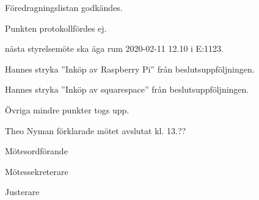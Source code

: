 \documentclass[10pt]{article}
\def\mo{Theo Nyman}
\def\ms{Hannes Björk}
\def\ji{???}
\begin{document}
\begin{paragrafer}

Föredragningslistan godkändes.


\begin{fyllnadsval} %



\end{fyllnadsval}

\begin{paragrafer}

Punkten protokollfördes ej.





 





\end{paragrafer}








\Mba nästa styrelsemöte ska äga rum 2020-02-11 12.10 i E:1123.


Hannes \ypa stryka ''Inköp av Raspberry Pi'' från beslutsuppföljningen.

\Mbaby 

Hannes \ypa stryka ''Inköp av squarespace'' från beslutsuppföljningen.

\Mbaby 







Övriga mindre punkter togs upp.

{\mo} förklarade mötet avslutat kl. 13.??
\end{paragrafer}

\hidesignfoot
\begin{signatures}{3}
\signature{\mo}{Mötesordförande}
\signature{\ms}{Mötessekreterare}
\signature{\ji}{Justerare}
\end{signatures}
\end{document}
